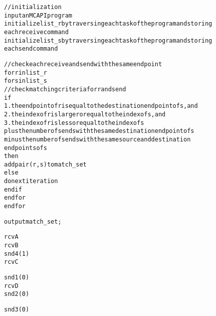 
\newsavebox{\boxalgorithm}
\begin{lrbox}{\boxalgorithm}
\begin{minipage}[c]{1.4\linewidth}
\begin{alltt}
//initialization
input an MCAPI program
initialize list_r by traversing each task of the program and storing
each receive command
initialize list_s by traversing each task of the program and storing
each send command

//check each receive and send with the same endpoint
for r in list_r
  for s in list_s
    //check matching criteria for r and send
    if
      1.the endpoint of r is equal to the destination endpoint of s, and
      2.the index of r is larger or equal to the index of s, and
      3.the index of r is less or equal to the index of s
        plus the number of sends with the same destination endpoint of s
        minus the number of sends with the same source and destination
        endpoints of s
    then
      add pair (r, s) to match_set
    else
      do next iteration
    end if
  end for
end for

output match_set;
\end{alltt}
\end{minipage}
\end{lrbox}

\newsavebox{\boxtaskzero}
\begin{lrbox}{\boxtaskzero}
\begin{minipage}[t]{0.2\linewidth}
\begin{alltt}
rcvA
rcvB
snd4(1)
rcvC
\end{alltt}
\end{minipage}
\end{lrbox}

\newsavebox{\boxtaskone}
\begin{lrbox}{\boxtaskone}
\begin{minipage}[t]{0.2\linewidth}
\begin{alltt}
snd1(0)
rcvD
snd2(0)
\end{alltt}
\end{minipage}
\end{lrbox}

\newsavebox{\boxtasktwo}
\begin{lrbox}{\boxtasktwo}
\begin{minipage}[t]{0.2\linewidth}
\begin{alltt}
snd3(0)
\end{alltt}
\end{minipage}
\end{lrbox}

